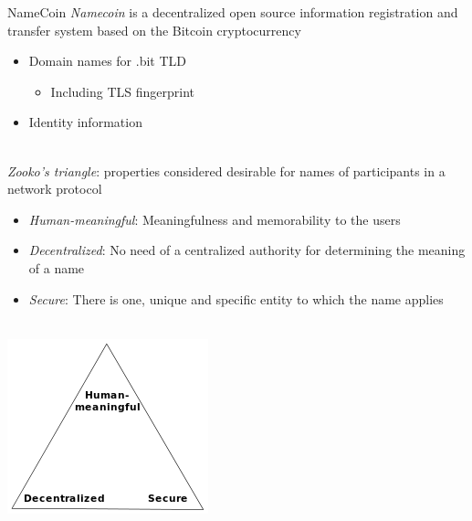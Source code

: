 \documentclass[11pt]{beamer}
\begin{document}
\begin{frame}{NameCoin}
\emph{Namecoin} is a decentralized open source information registration and transfer system based on the Bitcoin cryptocurrency
\begin{itemize}
\item Domain names for .bit TLD
\begin{itemize}
\item Including TLS fingerprint
\end{itemize}
\item Identity information 
\end{itemize}
\\[0.2cm]
\pause
\emph{Zooko's triangle}: properties considered desirable for names of participants in a network protocol
\begin{itemize}
\item \emph{Human-meaningful}: Meaningfulness and memorability to the users
\item \emph{Decentralized}: No need of a centralized authority for determining the meaning of a name
\item \emph{Secure}: There is one, unique and specific entity to which the name applies
\end{itemize}
\\[0.2cm]
\includegraphics[scale=0.2]{zooko_triangle.png}
\end{frame}
\end{document}
